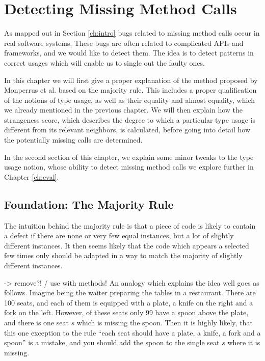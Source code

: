 \chapter{Detecting Missing Method Calls}\label{ch:dmmc}


As mapped out in Section \ref{ch:intro} bugs related to missing method calls occur in real software systems.
These bugs are often related to complicated APIs and frameworks, and we would like to detect them.
The idea is to detect patterns in correct usages which will enable us to single out the faulty ones.

In this chapter we will first give a proper explanation of the method proposed by Monperrus et al. \cite{monperrus2010detecting}\cite{monperrus2013detecting} based on the majority rule.
This includes a proper qualification of the notions of type usage, as well as their equality and almost equality, which we already mentioned in the previous chapter.
We will then explain how the strangeness score, which describes the degree to which a particular type usage is different from its relevant neighbors, is calculated, before going into detail how the potentially missing calls are determined.

In the second section of this chapter, we explain some minor tweaks to the type usage notion, whose ability to detect missing method calls we explore further in Chapter \ref{ch:eval}.

\section{Foundation: The Majority Rule}\label{sec:majority}

The intuition behind the majority rule is that a piece of code is likely to contain a defect if there are none or very few equal instances, but a lot of slightly different instances.
It then seems likely that the code which appears a selected few times only should be adapted in a way to match the majority of slightly different instances.

-> remove?! / use with methods!
An analogy which explains the idea well goes as follows.
Imagine being the waiter preparing the tables in a restaurant.
There are 100 seats, and each of them is equipped with a plate, a knife on the right and a fork on the left.
However, of these seats only 99 have a spoon above the plate, and there is one seat $s$ which is missing the spoon.
Then it is highly likely, that this one exception to the rule ``each seat should have a plate, a knife, a fork and a spoon'' is a mistake, and you should add the spoon to the single seat $s$ where it is missing.


